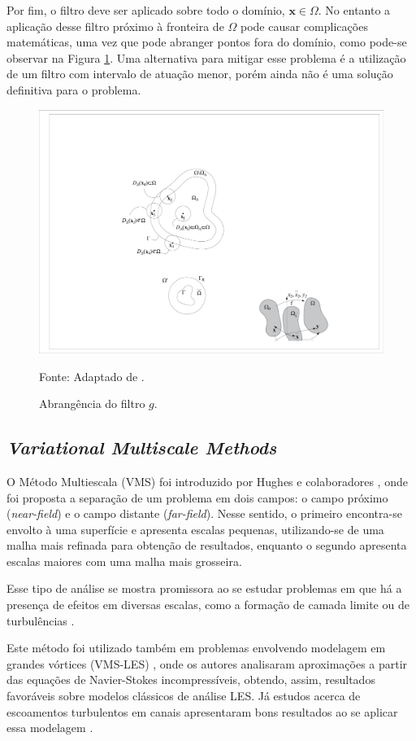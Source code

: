 \documentclass[_ArquivoPrincipal.tex]{subfiles}
\begin{document}
Por fim, o filtro deve ser aplicado sobre todo o domínio, $\mathbf{x}\in\Omega$. No entanto a aplicação desse filtro próximo à fronteira de $\Omega$ pode causar complicações matemáticas, uma vez que pode abranger pontos fora do domínio, como pode-se observar na Figura \ref{fig:AbrFiltro}. Uma alternativa para mitigar esse problema é a utilização de um filtro com intervalo de atuação menor, porém ainda não é uma solução definitiva para o problema.

\begin{figure}[h]
    \centering
    \includegraphics[width=0.5\linewidth]{Figuras/AbrFiltro.pdf}
    \caption{Abrangência do filtro $g$.}
    Fonte: Adaptado de .
    \label{fig:AbrFiltro}
\end{figure}

\subsection{\textit{Variational Multiscale Methods}} \label{VMS}

O Método Multiescala (VMS) foi introduzido por Hughes e colaboradores \cite{hughes1995multiscale, hughes1996space, hughes1998variational}, onde foi proposta a separação de um problema em dois campos: o campo próximo (\textit{near-field}) e o campo distante (\textit{far-field}). Nesse sentido, o primeiro encontra-se envolto à uma superfície e apresenta escalas pequenas, utilizando-se de uma malha mais refinada para obtenção de resultados, enquanto o segundo apresenta escalas maiores com uma malha mais grosseira.

Esse tipo de análise se mostra promissora ao se estudar problemas em que há a presença de efeitos em diversas escalas, como a formação de camada limite ou de turbulências \cite{fernandes2020tecnica}.

Este método foi utilizado também em problemas envolvendo modelagem em grandes vórtices (VMS-LES) \cite{hughes2000large, bazilevs2007variational}, onde os autores analisaram aproximações a partir das equações de Navier-Stokes incompressíveis, obtendo, assim, resultados favoráveis sobre modelos clássicos de análise LES. Já estudos acerca de escoamentos turbulentos em canais apresentaram bons resultados ao se aplicar essa modelagem \cite{hughes2002variational}.
\end{document}

